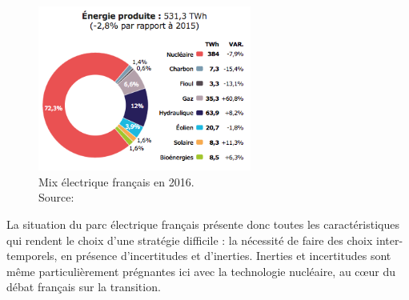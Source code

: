 \begin{figure}[!ht]
	\centering
	\includegraphics[width=7cm]{figures/RTE_Mix.png}
	\caption[Mix électrique français en 2016]{Mix électrique français en 2016.\\Source: \citet[p. 4]{RTE2016}}
\end{figure}

La situation du parc électrique français présente donc toutes les caractéristiques qui rendent le choix d’une stratégie difficile : la nécessité de faire des choix inter-temporels, en présence d’incertitudes et d’inerties. Inerties et incertitudes sont même particulièrement prégnantes ici avec la technologie nucléaire, au cœur du débat français sur la transition. 

